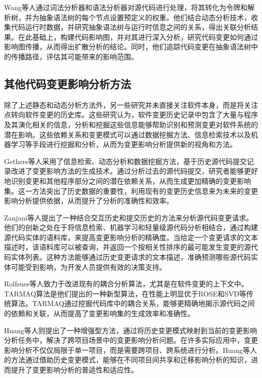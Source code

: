Wang等人\cite{王海龙0一种基于代码树分析的代码影响范围分析方法}通过词法分析器和语法分析器对源代码进行处理，将其转化为令牌和解析树，并为抽象语法树的每个节点设置预定义的权重。他们结合动态分析技术，收集代码运行时数据，并研究抽象语法树与运行时信息之间的关系，得出关联分析结果。在此基础上，构建代码影响图，并对其进行深入分析，研究代码变更如何通过影响图传播，从而得出扩散分析的结论。同时，他们追踪代码变更在抽象语法树中的传播路径，评估其可能带来的影响范围。

\subsection{其他代码变更影响分析方法}

除了上述静态和动态分析方法外，另一些研究并未直接关注软件本身，而是将关注点转向软件变更的历史库\cite{2011An, Markus2017Supporting, 2008Mining, 2014Impact, 2016Generalizing}。这些研究认为，软件变更历史记录中包含了大量与程序及其演化相关的信息，分析和挖掘这些信息能够帮助识别和预测变更对软件系统的潜在影响。这些依赖关系和变更模式可以通过数据挖掘方法、信息检索技术以及机器学习等手段进行挖掘和分析，从而为变更影响分析提供新的视角和方法。

Gethers等人\cite{2011An}采用了信息检索、动态分析和数据挖掘方法，基于历史源代码提交记录改进了变更影响方法的生成技术。通过分析过去的源代码提交，研究者能够更好地识别变更和其他程序部分之间的潜在依赖关系，从而生成更加精确的变更影响集。这一方法突出了历史数据的重要性，利用现有的变更历史信息来为未来的变更影响分析提供依据，从而提升了分析的准确性和效率。

Zanjani等人\cite{2014Impact}提出了一种结合交互历史和提交历史的方法来分析源代码变更请求。他们的创新之处在于将信息检索、机器学习和轻量级源代码分析相结合，通过构建源代码实体的语料库，来提高变更影响分析的精确度。当给定一个变更请求的文本描述时，该语料库可以被查询，并返回一个按相关性排序的最可能发生变更的源代码实体列表。这种方法能够通过历史变更请求的文本描述，准确预测哪些源代码实体可能受到影响，为开发人员提供有效的决策支持。

Rolfsnes等人\cite{2016Generalizing}致力于改进现有的耦合分析算法，尤其是在软件变更的上下文中。TARMAQ算法是他们提出的一种新型算法，在性能上明显优于ROSE\cite{2005Mining}和SVD等传统算法。TARMAQ通过挖掘代码库中的耦合关系，能够更精确地揭示源代码之间的依赖和关联，从而提高了变更影响集的生成效率和准确性。

Huang等人\cite{2021Change}则提出了一种增强型方法，通过将历史变更模式映射到当前的变更影响分析任务中，解决了跨项目场景中的变更影响分析问题。在许多实际应用中，变更影响分析不仅仅局限于单一项目，而是需要跨项目、跨系统进行分析。Huang等人的方法通过借助历史变更模式，能够在不同项目间共享和迁移影响分析的知识，进而提升了变更影响分析的普适性和适应性。


